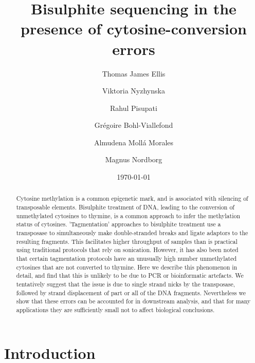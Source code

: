 \documentclass[12pt,longbibliography]{article}
\title{Bisulphite sequencing in the presence of cytosine-conversion errors} %
\author{
    Thomas James Ellis 
    \and
    Viktoria Nyzhynska
    \and
    Rahul Pisupati 
    \and
    Gr\'{e}goire Bohl-Viallefond
    \and
    Almudena Moll\'a Morales
    \and
    Magnus Nordborg
}
\date{\today} %
\begin{document}
\maketitle

\begin{abstract}
    Cytosine methylation is a common epigenetic mark, and is associated with silencing of transposable elements.
    Bisulphite treatment of DNA, leading to the conversion of unmethylated cytosines to thymine, is a common approach to infer the methylation status of cytosines.
    'Tagmentation' approaches to bisulphite treatment use a transposase to simultaneously make double-stranded breaks and ligate adaptors to the resulting fragments.
    This facilitates higher throughput of samples than is practical using traditional protocols that rely on sonication.
    However, it has also been noted that certain tagmentation protocols have an unusually high number unmethylated cytosines that are not converted to thymine.
    Here we describe this phenomenon in detail, and find that this is unlikely to be due to PCR or bioinformatic artefacts.
    We tentatively suggest that the issue is due to single strand nicks by the transposase, followed by strand displacement of part or all of the DNA fragments.
    Nevertheless we show that these errors can be accounted for in downstream analysis, and that for many applications they are sufficiently small not to affect biological conclusions.
    \end{abstract}






\maketitle


\section{Introduction}
\end{document}
